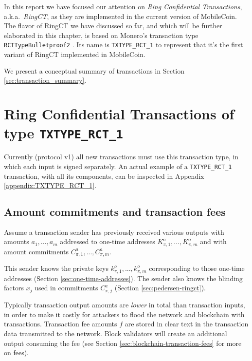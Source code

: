 In this report we have focused our attention on {\em Ring Confidential Transactions}, a.k.a.\ {\em RingCT}, as they are implemented in the current version of MobileCoin. The flavor of RingCT we have discussed so far, and which will be further elaborated in this chapter, is based on Monero's transaction type {\tt RCTTypeBulletproof2} \cite{ztm-2}. Its name is {\tt TXTYPE\_RCT\_1} to represent that it's the first variant of RingCT implemented in MobileCoin.

We present a conceptual summary of transactions in Section \ref{sec:transaction_summary}.



\section{Ring Confidential Transactions of type {\tt TXTYPE\_RCT\_1}}
\label{sec:RCT-transactions}

Currently (protocol v1) all new transactions must use this transaction type, in which each input is signed separately. An actual example of a {\tt TXTYPE\_RCT\_1} transaction, with all its components, can be inspected in Appendix \ref{appendix:TXTYPE_RCT_1}.


\subsection{Amount commitments and transaction fees}
\label{sec:commitments-and-fees}

Assume a transaction sender has previously received various outputs with amounts $a_1, ..., a_m$ addressed to one-time addresses $K^o_{\pi,1}, ..., K^o_{\pi,m}$ and with amount commitments $C^a_{\pi,1}, ..., C^a_{\pi,m}$.

This sender knows the private keys $k^o_{\pi,1}, ..., k^o_{\pi,m}$ corresponding to those one-time addresses (Section \ref{sec:one-time-addresses}). The sender also knows the blinding factors $x_j$ used in commitments $C^a_{\pi,j}$ (Section \ref{sec:pedersen-ringct}).

Typically transaction output amounts are {\em lower} in total than transaction inputs, in order to make it costly for attackers to flood the network and blockchain with transactions. Transaction fee amounts $f$ are stored in clear text in the transaction data transmitted to the network. Block validators will create an additional output consuming the fee (see Section \ref{sec:blockchain-transaction-fees} for more on fees).

